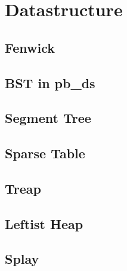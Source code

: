 \section{Datastructure}
\subsection{Fenwick}



\subsection{BST in pb\_ds}


\subsection{Segment Tree}



\subsection{Sparse Table}


\subsection{Treap}


\subsection{Leftist Heap}


\subsection{Splay}



